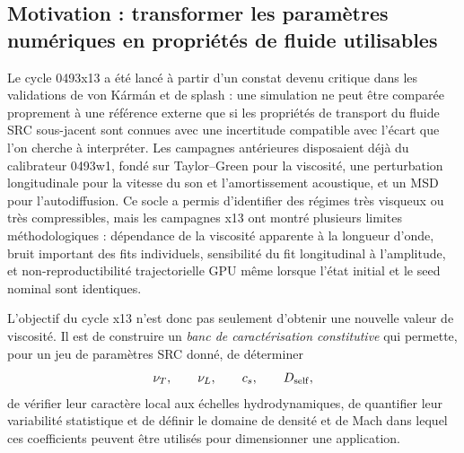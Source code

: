 \documentclass[11pt,a4paper]{article}
\begin{document}
\subsection{Motivation : transformer les paramètres numériques en propriétés de fluide utilisables}

Le cycle 0493x13 a été lancé à partir d'un constat devenu critique dans les validations de von Kármán et de splash : une simulation ne peut être comparée proprement à une référence externe que si les propriétés de transport du fluide SRC sous-jacent sont connues avec une incertitude compatible avec l'écart que l'on cherche à interpréter. Les campagnes antérieures disposaient déjà du calibrateur 0493w1, fondé sur Taylor--Green pour la viscosité, une perturbation longitudinale pour la vitesse du son et l'amortissement acoustique, et un MSD pour l'autodiffusion. Ce socle a permis d'identifier des régimes très visqueux ou très compressibles, mais les campagnes x13 ont montré plusieurs limites méthodologiques : dépendance de la viscosité apparente à la longueur d'onde, bruit important des fits individuels, sensibilité du fit longitudinal à l'amplitude, et non-reproductibilité trajectorielle GPU même lorsque l'état initial et le seed nominal sont identiques.

L'objectif du cycle x13 n'est donc pas seulement d'obtenir une nouvelle valeur de viscosité. Il est de construire un \emph{banc de caractérisation constitutive} qui permette, pour un jeu de paramètres SRC donné, de déterminer
\begin{equation}
  \nu_T,\qquad
  \nu_L,\qquad
  c_s,\qquad
  D_{\rm self},
\end{equation}
de vérifier leur caractère local aux échelles hydrodynamiques, de quantifier leur variabilité statistique et de définir le domaine de densité et de Mach dans lequel ces coefficients peuvent être utilisés pour dimensionner une application.
\end{document}
